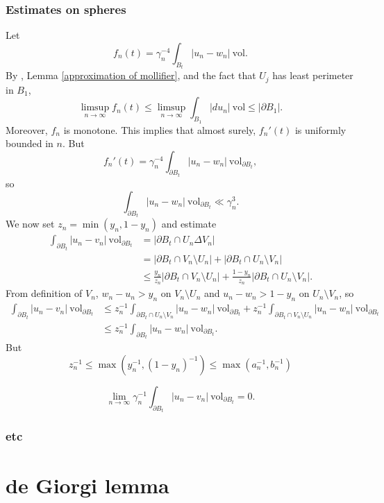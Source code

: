 \documentclass[reqno,12pt,letterpaper]{amsart}
\newcommand{\vol}{\mathrm{vol}}
\theoremstyle{definition}
\numberwithin{equation}{section}
\begin{document}
\subsubsection{Estimates on spheres}
Let
$$f_n(t) = \gamma_n^{-4} \int_{B_t} |u_n - w_n| ~\vol.$$
By \cite[Lemma 7.2]{Giusti77}, Lemma \ref{approximation of mollifier}, and the fact that $U_j$ has least perimeter in $B_1$,
$$\limsup_{n \to \infty} f_n(t) \leq \limsup_{n \to \infty} \int_{B_1} |du_n| ~\vol \leq |\partial B_1|.$$
Moreover, $f_n$ is monotone.
This implies that almost surely, $f_n'(t)$ is uniformly bounded in $n$.
But
$$f_n'(t) = \gamma_n^{-4} \int_{\partial B_t} |u_n - w_n| ~\vol_{\partial B_t},$$
so
$$\int_{\partial B_t} |u_n - w_n| ~\vol_{\partial B_t} \ll \gamma_n^3.$$
We now set $z_n = \min(y_n, 1 - y_n)$ and estimate
\begin{align*}
\int_{\partial B_t} |u_n - v_n| ~\vol_{\partial B_t} &= |\partial B_t \cap U_n \Delta V_n| \\
&= |\partial B_t \cap V_n \setminus U_n| + |\partial B_t \cap U_n \setminus V_n| \\
&\leq \frac{y_n}{z_n} |\partial B_t \cap V_n \setminus U_n| + \frac{1 - y_n}{z_n} |\partial B_t \cap U_n \setminus V_n|.
\end{align*}
From definition of $V_n$, $w_n - u_n > y_n$ on $V_n \setminus U_n$ and $u_n - w_n > 1 - y_n$ on $U_n \setminus V_n$, so
\begin{align*}
\int_{\partial B_t} |u_n - v_n| ~\vol_{\partial B_t} &\leq z_n^{-1} \int_{\partial B_t \cap U_n \setminus V_n} |u_n - w_n| ~\vol_{\partial B_t} + z_n^{-1}\int_{\partial B_t \cap V_n \setminus U_n} |u_n - w_n| ~\vol_{\partial B_t} \\
&\leq z_n^{-1} \int_{\partial B_t} |u_n - w_n| ~\vol_{\partial B_t}.
\end{align*}
But
$$z_n^{-1} \leq \max(y_n^{-1}, (1 - y_n)^{-1}) \leq \max(a_n^{-1}, b_n^{-1})$$

$$\lim_{n \to \infty} \gamma_n^{-1} \int_{\partial B_t} |u_n - v_n| ~\vol_{\partial B_t} = 0.$$

\subsubsection{etc}





\section{de Giorgi lemma}\label{DeGiorgiSection}
\end{document}
